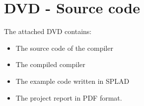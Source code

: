 \chapter{DVD - Source code}
\label{chap:appDVD}
The attached DVD contains:
	\begin{itemize}
		\item The source code of the compiler
		\item The compiled compiler
		\item The example code written in SPLAD
		\item The project report in PDF format.
	\end{itemize}